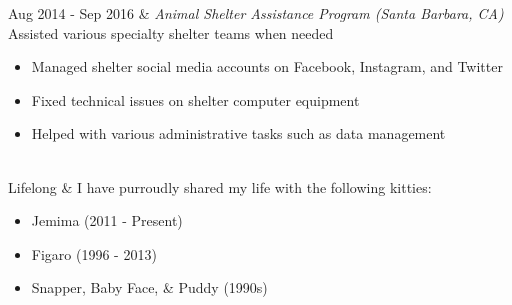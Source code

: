 \documentclass[
    changecolor={70,130,180}, 
]{cv-roald}
\begin{document}
\begin{tabularcv}
Aug 2014 - Sep 2016   &   
\newline \emph{Animal Shelter Assistance Program  \hspace{2mm} (Santa Barbara, CA)}
                \newline Assisted various specialty shelter teams when needed
 \begin{itemize}
		\item Managed shelter social media accounts on Facebook, Instagram, and Twitter
		\item Fixed technical issues on shelter computer equipment
		\item Helped with various administrative tasks such as data management
    \end{itemize} 
\\

Lifelong   &   
                \newline I have purroudly shared my life with the following kitties:
                \begin{itemize}   
                  \item Jemima (2011 - Present)
                  \item Figaro (1996 - 2013)
                  \item Snapper, Baby Face, \& Puddy (1990s)
                \end{itemize} 

\end{tabularcv}   
\end{document}
